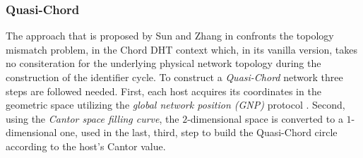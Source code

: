 \subsubsection{Quasi-Chord}
The approach that is proposed by Sun and Zhang in \cite{sun_quasi_2008}
confronts the topology mismatch problem, in the Chord DHT context which, in its
vanilla version, takes no consiteration for the underlying physical network
topology during the construction of the identifier cycle. To construct a
\emph{Quasi-Chord} network three steps are followed needed. First, each host
acquires its coordinates in the geometric space utilizing the \emph{global
network position (GNP)} protocol \cite{ng_gnp_2001}. Second, using the
\emph{Cantor space filling curve}, the $2$-dimensional space is converted to a
$1$-dimensional one, used in the last, third, step to build the Quasi-Chord
circle according to the host's Cantor value.


